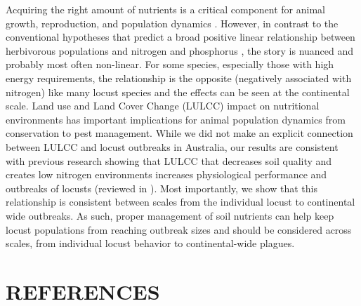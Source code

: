 \documentclass[
]{article}
\begin{document}
Acquiring the right amount of nutrients is a critical component for
animal growth, reproduction, and population dynamics
\citep{doonan_effects_1995, hansson_food_1979, keith_role_1983}.
However, in contrast to the conventional hypotheses that predict a broad
positive linear relationship between herbivorous populations and
nitrogen and phosphorus
\citep{huberty_consequences_2006, mattson_herbivory_1980, white_importance_1978, white_inadequate_1993},
the story is nuanced and probably most often non-linear. For some
species, especially those with high energy requirements, the
relationship is the opposite (negatively associated with nitrogen) like
many locust species and the effects can be seen at the continental
scale. Land use and Land Cover Change (LULCC) impact on nutritional
environments has important implications for animal population dynamics
from conservation to pest management. While we did not make an explicit
connection between LULCC and locust outbreaks in Australia, our results
are consistent with previous research showing that LULCC that decreases
soil quality and creates low nitrogen environments increases
physiological performance and outbreaks of locusts (reviewed in
\citet{le_gall_global_2019}). Most importantly, we show that this
relationship is consistent between scales from the individual locust to
continental wide outbreaks. As such, proper management of soil nutrients
can help keep locust populations from reaching outbreak sizes and should
be considered across scales, from individual locust behavior to
continental-wide plagues.

\section{REFERENCES}\label{references}

\renewcommand{\bibsection}{}

\end{document}
